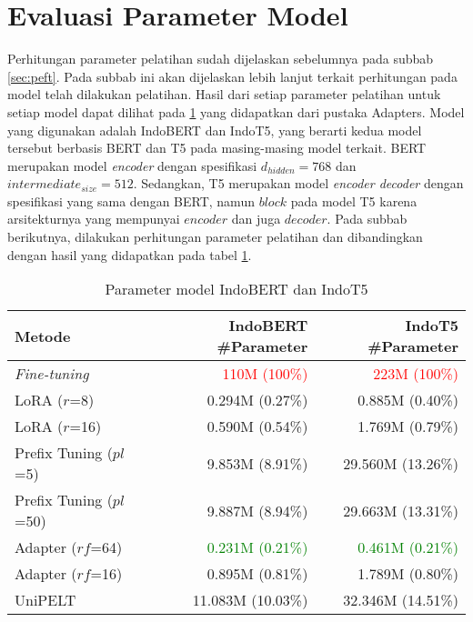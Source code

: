 \section{Evaluasi Parameter Model}

Perhitungan parameter pelatihan sudah dijelaskan sebelumnya pada subbab \ref{sec:peft}. Pada subbab ini akan dijelaskan lebih lanjut terkait perhitungan pada model telah dilakukan pelatihan. Hasil dari setiap parameter pelatihan untuk setiap model dapat dilihat pada \ref{table:param-model} yang didapatkan dari pustaka Adapters. Model yang digunakan adalah IndoBERT dan IndoT5, yang berarti kedua model tersebut berbasis BERT dan T5 pada masing-masing model terkait. BERT merupakan model \textit{encoder} dengan spesifikasi $d_{hidden} = 768$ dan $intermediate_{size} = 512$. Sedangkan, T5 merupakan model \textit{encoder decoder} dengan spesifikasi yang sama dengan BERT, namun $block$ pada model T5 karena arsitekturnya yang mempunyai $encoder$ dan juga $decoder$. Pada subbab berikutnya, dilakukan perhitungan parameter pelatihan dan dibandingkan dengan hasil yang didapatkan pada tabel \ref{table:param-model}.

\begin{table}[h]
    \centering
    \caption{Parameter model IndoBERT dan IndoT5}
    \label{table:param-model}
    \begin{tabular}{l|r|r}
        \toprule
        \textbf{Metode} & \textbf{IndoBERT \#Parameter} & \textbf{IndoT5 \#Parameter} \\
        \midrule
        \textit{Fine-tuning} & \textcolor{Red}{110M (100\%)} & \textcolor{Red}{223M (100\%)} \\
        LoRA ($r$=8) & 0.294M (0.27\%) & 0.885M (0.40\%) \\
        LoRA ($r$=16) & 0.590M (0.54\%) & 1.769M (0.79\%) \\
        Prefix Tuning ($pl$=5) & 9.853M (8.91\%) & 29.560M (13.26\%) \\
        Prefix Tuning ($pl$=50) & 9.887M (8.94\%) & 29.663M (13.31\%) \\
        Adapter ($rf$=64) & \textcolor{Green}{0.231M (0.21\%)} & \textcolor{Green}{0.461M (0.21\%)} \\
        Adapter ($rf$=16) & 0.895M (0.81\%) & 1.789M (0.80\%) \\
        UniPELT & 11.083M (10.03\%) & 32.346M (14.51\%) \\
        \bottomrule
    \end{tabular}
\end{table}

